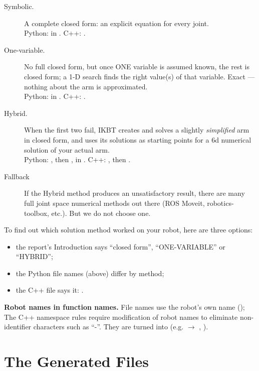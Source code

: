 \documentclass[11pt]{article}
\begin{document}
\begin{description}
\item[Symbolic.]  A complete closed form:  an explicit equation for every joint.\\
  Python:   in .
  C++:  .
\item[One-variable.]  No full closed form, but once ONE variable is assumed
  known, the rest is closed form;  a 1-D search finds the right value(s) of that
  variable.  Exact --- nothing about the arm is approximated.\\
  Python:   in .
  C++:  .
\item[Hybrid.]  When the first two fail, IKBT creates and solves a slightly \emph{simplified}
  arm in closed form, and uses its solutions as starting points for a 6d numerical
  solution of your actual arm.\\
  Python:  , then
  , in .
  C++:  , then .

 \item[Fallback]  If the Hybrid method produces an unsatisfactory result, there are many
 full joint space numerical methods out there (ROS Moveit, robotics-toolbox, etc.).  But we do not
 choose one.
\end{description}

To find out which solution method worked on your robot, here are three options:
\begin{itemize}
\item the report's Introduction says ``closed form'', ``ONE-VARIABLE'' or
  ``HYBRID'';
\item the Python file names (above) differ by method;
\item the C++ file says it:
  .
\end{itemize}

\textbf{Robot names in function names.}  File names use the robot's own name
();  The C++ namespace rules require modification of robot
names to eliminate non-identifier characters such as ``-''.  They are
turned into \code{_} (e.g.  $\to$ ,
).

\section{The Generated Files}
\end{document}
